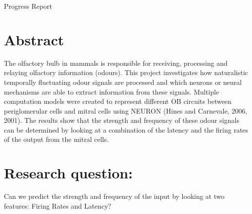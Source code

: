 \documentclass[11pt]{report}
\begin{document}
\begin{center}
{\Huge Progress Report}
\end{center}

\section*{Abstract}
The olfactory bulb in mammals is responsible for receiving, processing and relaying olfactory information (odours). This project investigates how naturalistic temporally fluctuating odour signals are processed and which neurons 
or neural mechanisms are able to extract information from these signals. Multiple computation models were created to represent different OB circuits between periglomerular cells and mitral cells using NEURON (Hines and Carnevale, 2006, 2001). 
The results show that the strength and frequency of these odour signals can be determined by looking at a combination of the latency and the firing rates of the output from the mitral cells. 

\section*{Research question:}
Can we predict the strength and frequency of the input by looking at two features: Firing Rates and Latency?\\
\end{document}
